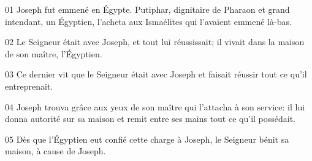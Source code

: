 01 Joseph fut emmené en Égypte. Putiphar, dignitaire de Pharaon et grand intendant, un Égyptien, l’acheta aux Ismaélites qui l’avaient emmené là-bas.

02 Le Seigneur était avec Joseph, et tout lui réussissait; il vivait dans la maison de son maître, l’Égyptien.

03 Ce dernier vit que le Seigneur était avec Joseph et faisait réussir tout ce qu’il entreprenait.

04 Joseph trouva grâce aux yeux de son maître qui l’attacha à son service: il lui donna autorité sur sa maison et remit entre ses mains tout ce qu’il possédait.

05 Dès que l’Égyptien eut confié cette charge à Joseph, le Seigneur bénit sa maison, à cause de Joseph.